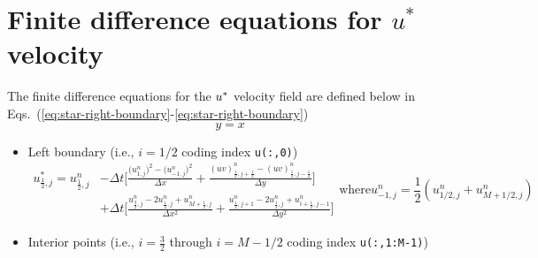 \section{Finite difference equations for $u^{\ast}$ velocity}
The finite difference equations for the $u^{\ast}$ velocity field are defined
below in Eqs.~(\ref{eq:star-right-boundary}-\ref{eq:star-right-boundary})
\begin{equation}
    y = x 
\end{equation}

\begin{itemize}
    \item Left boundary (i.e., $i=1/2$ coding index \texttt{u(:,0)})
        \begin{subequations}
            \begin{equation}
                \begin{aligned}
                    u^{\ast}_{\frac{1}{2},j} = u^{n}_{\frac{1}{2},j} & -  \Delta t\Bigg[ 
                    \frac{
                        \big(u^{n}_{1,j}\big)^{2} - \big(u^{n}_{-1,j}\big)^{2}
                    }{\Delta x} +
                    \frac{
                        \left(uv\right)^{n}_{\frac{1}{2},j+\frac{1}{2}} - \left(uv\right)^{n}_{\frac{1}{2},j-\frac{1}{2}}
                    }{\Delta y}
                    \Bigg]\\
                    & + \Delta t \Bigg[
                        \frac{
                            u^{n}_{\frac{3}{2},j} - 2u^{n}_{\frac{1}{2},j} + u^{n}_{M+\frac{1}{2},j}
                        }{\Delta x^{2}}
                     + 
                        \frac{
                            u^{n}_{\frac{1}{2},j+1} - 2u^{n}_{\frac{1}{2},j} + u^{n}_{i+\frac{1}{2},j-1}
                        }{\Delta y^{2}}
                        \Bigg]
                \end{aligned}
            \end{equation}
            \text{where} 
            \begin{equation}
                u^{n}_{-1,j} = \frac{1}{2} \left(u^{n}_{1/2,j} + u^{n}_{M+1/2,j} \right)
            \end{equation}
            \label{eq:star-left-boundary}
        \end{subequations}
    \vspace{0.1in}
    \item Interior points (i.e., $i=\frac{3}{2}$ through $i=M-1/2$ coding index \texttt{u(:,1:M-1)})
        \begin{equation}
            \begin{aligned}

\end{aligned}
\end{equation}
\end{itemize}
